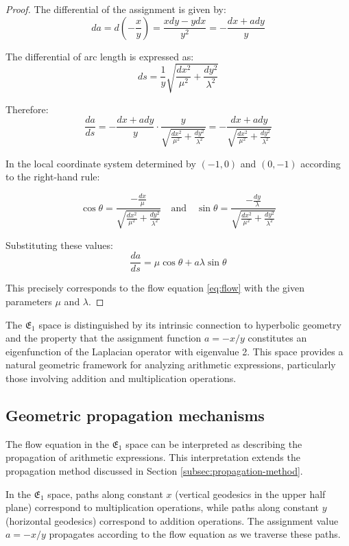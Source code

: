 \begin{proof}
The differential of the assignment is given by:
$$
da = d\left(-\frac{x}{y}\right) = \frac{xdy - ydx}{y^2} = -\frac{dx + a dy}{y}
$$

The differential of arc length is expressed as:
$$
ds = \frac{1}{y}\sqrt{\frac{dx^2}{\mu^2} + \frac{dy^2}{\lambda^2}}
$$

Therefore:
$$
\frac{da}{ds} = - \frac{dx + a dy}{y} \cdot \frac{y}{\sqrt{\frac{dx^2}{\mu^2} + \frac{dy^2}{\lambda^2}}} = -\frac{dx + a dy}{\sqrt{\frac{dx^2}{\mu^2} + \frac{dy^2}{\lambda^2}}}
$$

In the local coordinate system determined by $(-1, 0)$ and $(0, -1)$ according to the right-hand rule:

$$
\cos \theta = \frac{-\frac{dx}{\mu}}{\sqrt{\frac{dx^2}{\mu^2} + \frac{dy^2}{\lambda^2}}} \quad \text{and} \quad \sin \theta = \frac{-\frac{dy}{\lambda}}{\sqrt{\frac{dx^2}{\mu^2} + \frac{dy^2}{\lambda^2}}}
$$

Substituting these values:
$$
\frac{da}{ds} = \mu \cos \theta + a \lambda \sin \theta
$$

This precisely corresponds to the flow equation \eqref{eq:flow} with the given parameters $\mu$ and $\lambda$.
\end{proof}

The $\mathfrak{E}_1$ space is distinguished by its intrinsic connection to hyperbolic geometry and the property that the assignment function $a = -x/y$ constitutes an eigenfunction of the Laplacian operator with eigenvalue 2. This space provides a natural geometric framework for analyzing arithmetic expressions, particularly those involving addition and multiplication operations.

\subsection{Geometric propagation mechanisms}\label{subsec:geompropagation}

The flow equation in the $\mathfrak{E}_1$ space can be interpreted as describing the propagation of arithmetic expressions. This interpretation extends the propagation method discussed in Section \ref{subsec:propagation-method}.

In the $\mathfrak{E}_1$ space, paths along constant $x$ (vertical geodesics in the upper half plane) correspond to multiplication operations, while paths along constant $y$ (horizontal geodesics) correspond to addition operations. The assignment value $a = -x/y$ propagates according to the flow equation as we traverse these paths.

